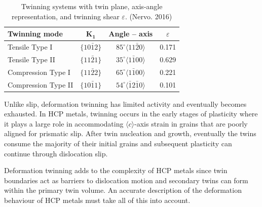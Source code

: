 \begin{table}[h]
  \vspace{\baselineskip}
  \centering
  \begin{tabular}{l c c c}
    \hline
    \rowcolor{gray!10}
    \textbf{Twinning mode} & $\mathbf{K_1}$   & \textbf{Angle – axis}                       & $\varepsilon$ \\
    \hline
    Tensile Type I         & $\{10\bar{1}2\}$ & $85^\circ \langle 11\bar{2}0 \rangle$       & 0.171         \\
    Tensile Type II        & $\{11\bar{2}1\}$ & $35^\circ \langle 1\bar{1}00 \rangle$       & 0.629         \\
    Compression Type I     & $\{11\bar{2}2\}$ & $65^\circ \langle 1\bar{1}00 \rangle$       & 0.221         \\
    Compression Type II    & $\{10\bar{1}1\}$ & $54^\circ \langle \bar{1}2\bar{1}0 \rangle$ & 0.101         \\
    \hline
  \end{tabular}
  \caption{Twinning systems with twin plane, axis-angle representation, and twinning shear $\varepsilon$. (Nervo. 2016)}
  \label{table.twin-modes}
\end{table}

Unlike slip, deformation twinning has limited activity and eventually becomes exhausted.
In HCP metals, twinning occurs in the early stages of plasticity where it plays a large role in accommodating $\langle c \rangle$-axis strain in grains that are poorly aligned for prismatic slip.
After twin nucleation and growth, eventually the twins consume the majority of their initial grains and subsequent plasticity can continue through dislocation slip.

Deformation twinning adds to the complexity of HCP metals since twin boundaries act as barriers to dislocation motion and secondary twins can form within the primary twin volume.
An accurate description of the deformation behaviour of HCP metals must take all of this into account.

